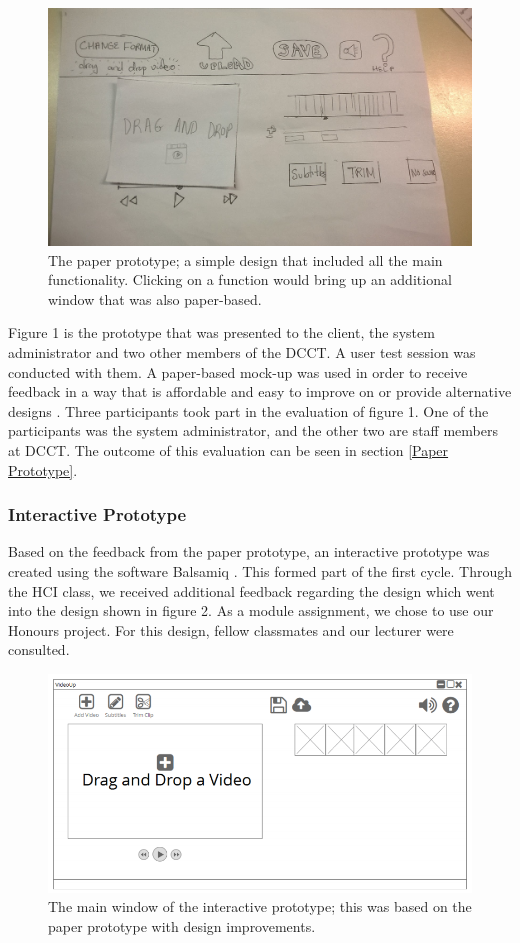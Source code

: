 \documentclass{sig-alternate-05-2015}
\begin{document}
\begin{figure} [h]
\includegraphics[scale=0.15]{paper}
\caption{The paper prototype; a simple design that included all the main functionality. Clicking on a function would bring up an additional window that was also paper-based.}
\end{figure}

Figure 1 is the prototype that was presented to the client, the system administrator and two other members of the DCCT. A user test session was conducted with them. A paper-based mock-up was used in order to receive feedback in a way that is affordable and easy to improve on or provide alternative designs \cite{sefelin2003paper}. Three participants took part in the evaluation of figure 1. One of the participants was the system administrator, and the other two are staff members at DCCT. The outcome of this evaluation can be seen in section \ref{Paper Prototype}.

\subsubsection{Interactive Prototype}
Based on the feedback from the paper prototype, an interactive prototype was created using the software Balsamiq \cite{studios2011balsamiq}. This formed part of the first cycle. Through the HCI class, we received additional feedback regarding the design which went into the design shown in figure 2. As a module assignment, we chose to use our Honours project. For this design, fellow classmates and our lecturer were consulted.

\begin{figure} [h]
\includegraphics[scale=0.4]{interactive1}
\caption{The main window of the interactive prototype; this was based on the paper prototype with design improvements.}
\end{figure}
\end{document}
